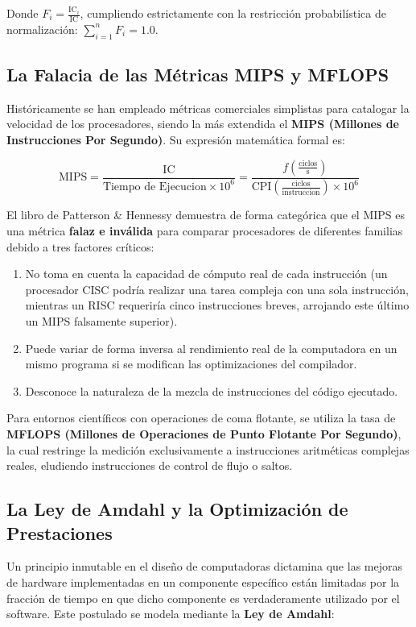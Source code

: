 \documentclass[12pt,letterpaper]{article}
\begin{document}
Donde $F_i = \frac{\text{IC}_i}{\text{IC}}$, cumpliendo estrictamente con la restricción probabilística de normalización: $\sum_{i=1}^{n} F_i = 1.0$.

\subsection{La Falacia de las Métricas MIPS y MFLOPS}
Históricamente se han empleado métricas comerciales simplistas para catalogar la velocidad de los procesadores, siendo la más extendida el \textbf{MIPS (Millones de Instrucciones Por Segundo)}. Su expresión matemática formal es:

\begin{equation}
\text{MIPS} = \frac{\text{IC}}{\text{Tiempo de Ejecucion} \times 10^6} = \frac{f \left(\frac{\text{ciclos}}{\text{s}}\right)}{\text{CPI} \left(\frac{\text{ciclos}}{\text{instruccion}}\right) \times 10^6}
\end{equation}

El libro de Patterson \& Hennessy demuestra de forma categórica que el MIPS es una métrica \textbf{falaz e inválida} para comparar procesadores de diferentes familias debido a tres factores críticos:
\begin{enumerate}
    \item No toma en cuenta la capacidad de cómputo real de cada instrucción (un procesador CISC podría realizar una tarea compleja con una sola instrucción, mientras un RISC requeriría cinco instrucciones breves, arrojando este último un MIPS falsamente superior).
    \item Puede variar de forma inversa al rendimiento real de la computadora en un mismo programa si se modifican las optimizaciones del compilador.
    \item Desconoce la naturaleza de la mezcla de instrucciones del código ejecutado.
\end{enumerate}

Para entornos científicos con operaciones de coma flotante, se utiliza la tasa de \textbf{MFLOPS (Millones de Operaciones de Punto Flotante Por Segundo)}, la cual restringe la medición exclusivamente a instrucciones aritméticas complejas reales, eludiendo instrucciones de control de flujo o saltos.

\subsection{La Ley de Amdahl y la Optimización de Prestaciones}
Un principio inmutable en el diseño de computadoras dictamina que las mejoras de hardware implementadas en un componente específico están limitadas por la fracción de tiempo en que dicho componente es verdaderamente utilizado por el software. Este postulado se modela mediante la \textbf{Ley de Amdahl}:
\end{document}
